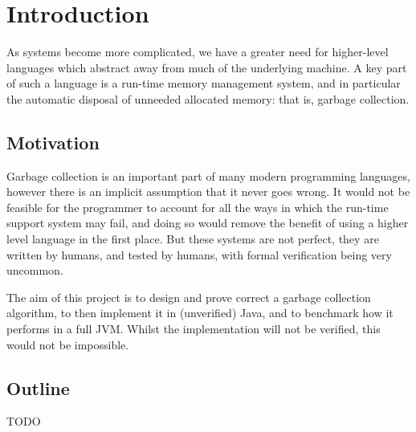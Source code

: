 \chapter{Introduction}

As systems become more complicated, we have a greater need for
higher-level languages which abstract away from much of the underlying
machine. A key part of such a language is a run-time memory management
system, and in particular the automatic disposal of unneeded allocated
memory: that is, garbage collection.

\section{Motivation}

Garbage collection is an important part of many modern programming
languages, however there is an implicit assumption that it never goes
wrong. It would not be feasible for the programmer to account for all
the ways in which the run-time support system may fail, and doing so
would remove the benefit of using a higher level language in the first
place. But these systems are not perfect, they are written by humans,
and tested by humans, with formal verification being very uncommon.

The aim of this project is to design and prove correct a garbage
collection algorithm, to then implement it in (unverified) Java, and
to benchmark how it performs in a full JVM. Whilst the implementation
will not be verified, this would not be impossible.

\section{Outline}

TODO
